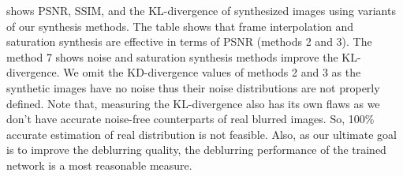  shows PSNR, SSIM, and the KL-divergence of synthesized images using variants of our synthesis methods. 
The table shows that frame interpolation and saturation synthesis are effective in terms of PSNR (methods 2 and 3). The method 7 shows noise and saturation synthesis methods improve the KL-divergence. We omit the KD-divergence values of methods 2 and 3 as the synthetic images have no noise thus their noise distributions are not properly defined.
Note that, measuring the KL-divergence also has its own flaws as we don't have accurate noise-free counterparts of real blurred images. So, 100\% accurate estimation of real distribution is not feasible.
Also, as our ultimate goal is to improve the deblurring quality, the deblurring performance of the trained network is a most reasonable measure. 

\setlength{\tabcolsep}{7pt}
\begin{table}[t]
\centering
\caption{Comparison among different blur synthesis methods. We compute PSNR, SSIM and KL-divergence (KLD) from synthesized and real blurred images.}
\label{tbl:additional_metrics}
\end{table}




